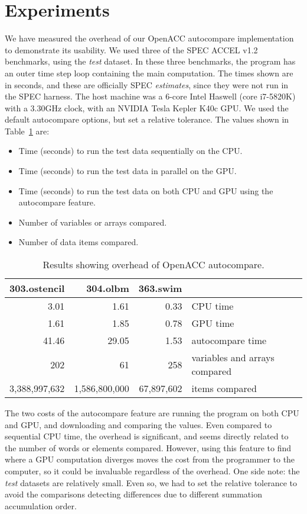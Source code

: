 \section{Experiments}

We have measured the overhead of our OpenACC autocompare implementation to demonstrate its usability.
We used three of the SPEC ACCEL v1.2 benchmarks, using the \emph{test} dataset.
In these three benchmarks, the program has an outer time step loop containing the main computation.
The times shown are in seconds, and these are officially SPEC \emph{estimates}, since they were not run in the SPEC harness.
The host machine was a 6-core Intel Haswell (core i7-5820K) with a 3.30GHz clock, with an NVIDIA Tesla Kepler K40c GPU.
We used the default autocompare options, but set a relative tolerance.
The values shown in Table~\ref{res1} are:
\begin{itemize}
\item Time (seconds) to run the test data sequentially on the CPU.
\item Time (seconds) to run the test data in parallel on the GPU.
\item Time (seconds) to run the test data on both CPU and GPU using the autocompare feature.
\item Number of variables or arrays compared.
\item Number of data items compared.
\end{itemize}

\begin{table}
\begin{center}
\begin{tabular}{rrrl}
\hline
303.ostencil & 304.olbm & 363.swim & \\
\hline
 3.01 &  1.61 & 0.33 & CPU time \\
 1.61 &  1.85 & 0.78 & GPU time\\
41.46 & 29.05 & 1.53 & autocompare time \\
202 & 61 & 258 & variables and arrays compared \\
3,388,997,632 & 1,586,800,000 & 67,897,602 & items compared \\
\hline
\end{tabular}
\end{center}
\caption{Results showing overhead of OpenACC autocompare.}
\label{res1}
\end{table}

The two costs of the autocompare feature are running the program on both CPU and GPU, and downloading and comparing the values.
Even compared to sequential CPU time, the overhead is significant, and seems directly related to the number of words or elements compared.
However, using this feature to find where a GPU computation diverges moves the cost from the programmer to the computer, so it could be invaluable regardless of the overhead.
One side note: the \emph{test} datasets are relatively small.
Even so, we had to set the relative tolerance to avoid the comparisons detecting differences due to different summation accumulation order.
